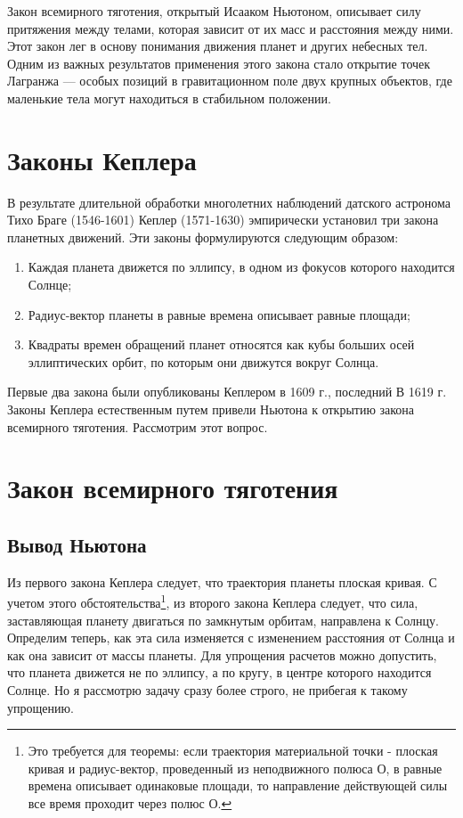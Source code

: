 \documentclass[a4paper,12pt]{article}
\begin{document}
Закон всемирного тяготения, открытый Исааком Ньютоном, описывает силу притяжения между телами, которая зависит от их масс и расстояния между ними.
Этот закон лег в основу понимания движения планет и других небесных тел.
Одним из важных результатов применения этого закона стало открытие точек Лагранжа — особых позиций в гравитационном поле двух крупных объектов,
где маленькие тела могут находиться в стабильном положении.

\section{Законы Кеплера}

В результате длительной обработки многолетних наблюдений датского астронома Тихо Браге (1546-1601) Кеплер (1571-1630) эмпирически установил три закона планетных движений.
Эти законы формулируются следующим образом:

\begin{enumerate}
\item Каждая планета движется по эллипсу, в одном из фокусов которого находится Солнце;
\item Радиус-вектор планеты в равные времена описывает равные площади;
\item Квадраты времен обращений планет относятся как кубы больших осей эллиптических орбит, по которым они движутся вокруг Солнца.
\end{enumerate}                                   

Первые два закона были опубликованы Кеплером в 1609 г., последний В 1619 г. Законы Кеплера естественным путем привели Ньютона к открытию закона всемирного тяготения.
Рассмотрим этот вопрос.

\section{Закон всемирного тяготения}
\subsection{Вывод Ньютона}
Из первого закона Кеплера следует, что траектория планеты плоская кривая. 
С учетом этого обстоятельства\footnote{Это требуется для теоремы: если траектория материальной точки - плоская кривая и радиус-вектор, проведенный из неподвижного полюса О, в равные времена описывает одинаковые площади, то направление действующей силы все время проходит через полюс О.}, из второго закона Кеплера следует, что сила, заставляющая планету двигаться по замкнутым орбитам, направлена к Солнцу. 
Определим теперь, как эта сила изменяется с изменением расстояния от Солнца и как она зависит от массы планеты.
Для упрощения расчетов можно допустить, что планета движется не по эллипсу, а по кругу, в центре которого находится Солнце.
Но я рассмотрю задачу сразу более строго, не прибегая к такому упрощению.
\end{document}
